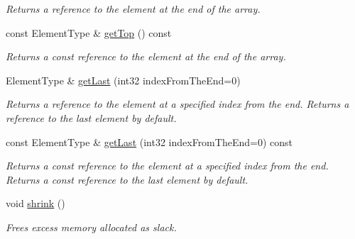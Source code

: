 \begin{DoxyCompactItemize}
\begin{DoxyCompactList}\small\item\em Returns a reference to the element at the end of the array. \end{DoxyCompactList}\item 
\mbox{\label{class_arcana_1_1_array_a9ff544fcf26455d50e65ff94c93e18b2}} 
const Element\+Type \& \mbox{\hyperlink{class_arcana_1_1_array_a9ff544fcf26455d50e65ff94c93e18b2}{get\+Top}} () const
\begin{DoxyCompactList}\small\item\em Returns a const reference to the element at the end of the array. \end{DoxyCompactList}\item 
\mbox{\label{class_arcana_1_1_array_ae9227c910d8c56e139de5336c0613e2f}} 
Element\+Type \& \mbox{\hyperlink{class_arcana_1_1_array_ae9227c910d8c56e139de5336c0613e2f}{get\+Last}} (int32 index\+From\+The\+End=0)
\begin{DoxyCompactList}\small\item\em Returns a reference to the element at a specified index from the end. Returns a reference to the last element by default. \end{DoxyCompactList}\item 
\mbox{\label{class_arcana_1_1_array_a571a0d44ef068fd78c20e3cb186c710e}} 
const Element\+Type \& \mbox{\hyperlink{class_arcana_1_1_array_a571a0d44ef068fd78c20e3cb186c710e}{get\+Last}} (int32 index\+From\+The\+End=0) const
\begin{DoxyCompactList}\small\item\em Returns a const reference to the element at a specified index from the end. Returns a const reference to the last element by default. \end{DoxyCompactList}\item 
\mbox{\label{class_arcana_1_1_array_acb1fd0b98e114bb123afc1fc0174a5ff}} 
void \mbox{\hyperlink{class_arcana_1_1_array_acb1fd0b98e114bb123afc1fc0174a5ff}{shrink}} ()
\begin{DoxyCompactList}\small\item\em Frees excess memory allocated as slack. \end{DoxyCompactList}\item 

\end{DoxyCompactItemize}
